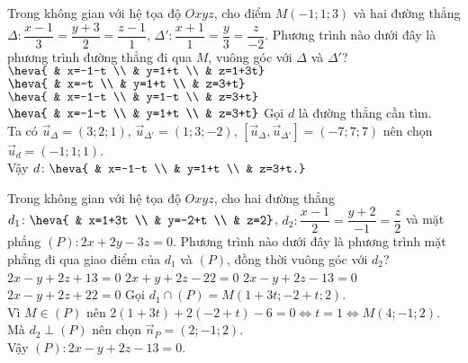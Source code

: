 \begin{ex}%
	Trong không gian với hệ tọa độ $Oxyz$, cho điểm  $M(-1;1;3)$ và hai đường thẳng $\Delta\colon \dfrac{x-1}{3}=\dfrac{y+3}{2}=\dfrac{z-1}{1}$, $\Delta'\colon \dfrac{x+1}{1}=\dfrac{y}{3}=\dfrac{z}{-2}$. Phương trình nào dưới đây là phương trình đường thẳng đi qua $M$, vuông góc với $\Delta$ và $\Delta'$?
	\choice
	{$\heva{ & x=-1-t \\ & y=1+t \\ & z=1+3t}$}
	{$\heva{ & x=-t \\ & y=1+t \\ & z=3+t}$}
	{$\heva{ & x=-1-t \\ & y=1-t \\ & z=3+t}$}
	{\True $\heva{ & x=-1-t \\ & y=1+t \\ & z=3+t}$}
	\loigiai
	{
		Gọi $d$ là đường thẳng cần tìm.\\
		Ta có $\overrightarrow{u}_{\Delta}=(3;2;1)$, $\overrightarrow{u}_{\Delta'}=(1;3;-2)$, $\left[\overrightarrow{u}_{\Delta},\overrightarrow{u}_{\Delta'}\right]=(-7;7;7)$ nên chọn $\overrightarrow{u}_{d}=(-1;1;1)$.\\
		Vậy $d\colon \heva{ & x=-1-t \\ & y=1+t \\ & z=3+t.}$
	}
\end{ex}

\begin{ex}%
	Trong không gian với hệ tọa độ $Oxyz$, cho hai đường thẳng $d_1\colon \heva{ & x=1+3t \\ & y=-2+t \\ & z=2}$, $d_2\colon \dfrac{x-1}{2}=\dfrac{y+2}{-1}=\dfrac{z}{2}$ và mặt phẳng $(P)\colon 2x+2y-3z=0$. Phương trình nào dưới đây là phương trình mặt phẳng đi qua giao điểm của $d_1$ và $(P)$, đồng thời vuông góc với $d_2$?
	\choice
	{$2x-y+2z+13=0$}
	{$2x+y+2z-22=0$}
	{\True $2x-y+2z-13=0$}
	{$2x-y+2z+22=0$}
	\loigiai
	{
		Gọi $d_1\cap (P)=M(1+3t;-2+t;2)$.\\
		Vì $M\in (P)$ nên $2(1+3t)+2(-2+t)-6=0\Leftrightarrow t=1 \Leftrightarrow M(4;-1;2)$.\\
		Mà $d_2\perp (P)$ nên chọn $\overrightarrow{n}_{P}=(2;-1;2)$.\\
		Vậy $(P)\colon 2x-y+2z-13=0$.
	}
\end{ex}

